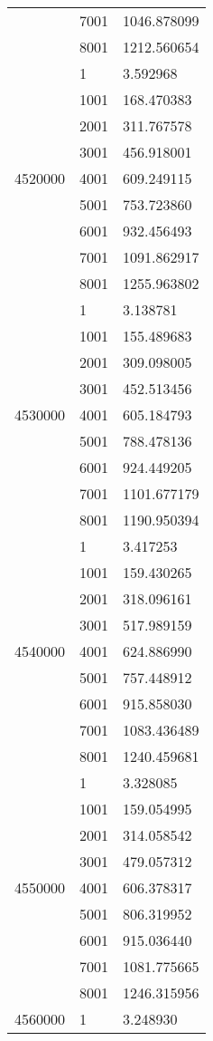 \begin{table}[htb!]
\begin{tabular}{lll}
 & 7001 & 1046.878099 \\
 & 8001 & 1212.560654 \\
\multirow[c]{9}{*}{4520000} & 1 & 3.592968 \\
 & 1001 & 168.470383 \\
 & 2001 & 311.767578 \\
 & 3001 & 456.918001 \\
 & 4001 & 609.249115 \\
 & 5001 & 753.723860 \\
 & 6001 & 932.456493 \\
 & 7001 & 1091.862917 \\
 & 8001 & 1255.963802 \\
\multirow[c]{9}{*}{4530000} & 1 & 3.138781 \\
 & 1001 & 155.489683 \\
 & 2001 & 309.098005 \\
 & 3001 & 452.513456 \\
 & 4001 & 605.184793 \\
 & 5001 & 788.478136 \\
 & 6001 & 924.449205 \\
 & 7001 & 1101.677179 \\
 & 8001 & 1190.950394 \\
\multirow[c]{9}{*}{4540000} & 1 & 3.417253 \\
 & 1001 & 159.430265 \\
 & 2001 & 318.096161 \\
 & 3001 & 517.989159 \\
 & 4001 & 624.886990 \\
 & 5001 & 757.448912 \\
 & 6001 & 915.858030 \\
 & 7001 & 1083.436489 \\
 & 8001 & 1240.459681 \\
\multirow[c]{9}{*}{4550000} & 1 & 3.328085 \\
 & 1001 & 159.054995 \\
 & 2001 & 314.058542 \\
 & 3001 & 479.057312 \\
 & 4001 & 606.378317 \\
 & 5001 & 806.319952 \\
 & 6001 & 915.036440 \\
 & 7001 & 1081.775665 \\
 & 8001 & 1246.315956 \\
\multirow[c]{9}{*}{4560000} & 1 & 3.248930 \\

\end{tabular}
\end{table}
